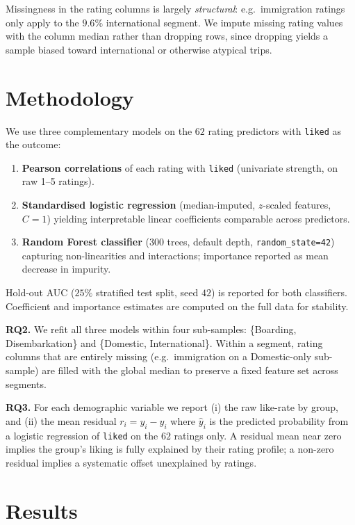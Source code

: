 \documentclass[11pt]{article}
\begin{document}
Missingness in the rating columns is largely \emph{structural}: e.g.\ immigration ratings only apply to the $9.6\%$ international segment. We impute missing rating values with the column median rather than dropping rows, since dropping yields a sample biased toward international or otherwise atypical trips.

\section{Methodology}
\label{sec:methods}

We use three complementary models on the $62$ rating predictors with \texttt{liked} as the outcome:

\begin{enumerate}
\item \textbf{Pearson correlations} of each rating with \texttt{liked} (univariate strength, on raw 1--5 ratings).
\item \textbf{Standardised logistic regression} (median-imputed, $z$-scaled features, $C=1$) yielding interpretable linear coefficients comparable across predictors.
\item \textbf{Random Forest classifier} ($300$ trees, default depth, \texttt{random\_state=42}) capturing non-linearities and interactions; importance reported as mean decrease in impurity.
\end{enumerate}

Hold-out AUC ($25\%$ stratified test split, seed $42$) is reported for both classifiers. Coefficient and importance estimates are computed on the full data for stability.

\textbf{RQ2.} We refit all three models within four sub-samples: \{Boarding, Disembarkation\} and \{Domestic, International\}. Within a segment, rating columns that are entirely missing (e.g.\ immigration on a Domestic-only sub-sample) are filled with the global median to preserve a fixed feature set across segments.

\textbf{RQ3.} For each demographic variable we report (i) the raw like-rate by group, and (ii) the mean residual $r_i = y_i - \hat y_i$ where $\hat y_i$ is the predicted probability from a logistic regression of \texttt{liked} on the $62$ ratings only. A residual mean near zero implies the group's liking is fully explained by their rating profile; a non-zero residual implies a systematic offset unexplained by ratings.


\section{Results}
\label{sec:results}
\end{document}
